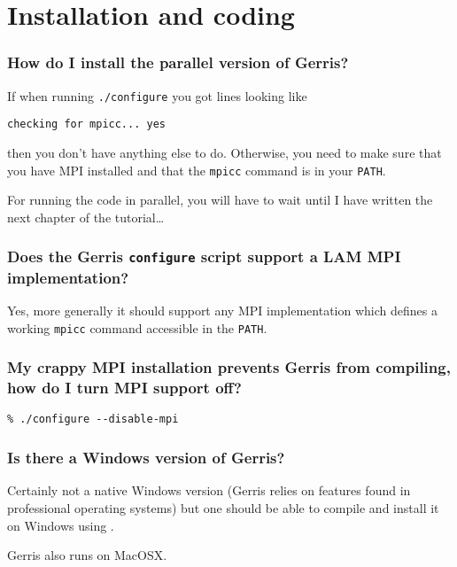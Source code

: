 \documentclass[a4paper]{article}
\begin{document}
\section{Installation and coding}

\subsubsection{How do I install the parallel version of Gerris?}

If when running {\tt ./configure} you got lines looking like
\begin{verbatim}
checking for mpicc... yes
\end{verbatim}
then you don't have anything else
to do. Otherwise, you need to make sure that you have MPI installed
and that the {\tt mpicc} command is in your {\tt PATH}.

For running the code in parallel, you will have to wait until I have
written the next chapter of the tutorial\dots

\subsubsection{Does the Gerris {\tt configure} script support a LAM MPI implementation?}

Yes, more generally it should support any MPI implementation which
defines a working {\tt mpicc} command accessible in the {\tt PATH}.

\subsubsection{My crappy MPI installation prevents Gerris from compiling, 
how do I turn MPI support off?}

\begin{verbatim}
% ./configure --disable-mpi
\end{verbatim}

\subsubsection{Is there a Windows version of Gerris?}

Certainly not a native Windows version (Gerris relies on features
found in professional operating systems) but one should be able to
compile and install it on Windows using .

Gerris also runs on MacOSX.
\end{document}
